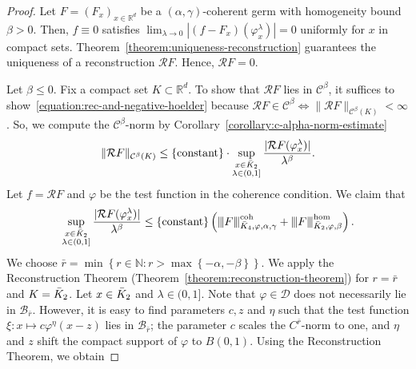 \begin{proof}
  Let \( F = (F_x)_{x \in \mathbb{R}^d} \) be a \( (\alpha, \gamma) \)-coherent germ with homogeneity bound \( \beta > 0 \). Then, \( f \equiv 0 \) satisfies \( \lim_{\lambda \to 0} |(f-F_x)(\varphi^\lambda_x)| = 0 \) uniformly for \( x \) in compact sets. Theorem~\ref{theorem:uniqueness-reconstruction} guarantees the uniqueness of a reconstruction \( \mathcal{R}F \). Hence, \( \mathcal{R}F = 0 \).

  Let \( \beta \leq 0 \). Fix a compact set \( K \subset \mathbb{R}^d \). To show that \( \mathcal{R}F \) lies in \( \mathcal{C}^\beta \), it suffices to show~\eqref{equation:rec-and-negative-hoelder} because \( \mathcal{R}F \in \mathcal{C}^\beta \iff \lVert \mathcal{R}F \rVert_{\mathcal{C}^\beta(K)} < \infty \). So, we compute the \( \mathcal{C}^\beta \)-norm by Corollary~\ref{corollary:c-alpha-norm-estimate}
  \begin{align*}
    \lVert \mathcal{R}F \rVert_{\mathcal{C}^\beta(K)}  
    \leq  
    \{ \mathrm{constant} \} \cdot \sup_{\substack{x \in \bar{K}_{2} \\ \lambda \in (0,1]}} 
    \frac{|\mathcal{R}F(\varphi^{\lambda}_x)|}{\lambda^\beta}.
  \end{align*}
  Let \( f = \mathcal{R}F \) and \( \varphi \) be the test function in the coherence condition. We claim that 
  \begin{align*}
    \sup_{\substack{x \in \bar{K}_{2} \\ \lambda \in (0,1]}} 
    \frac{|\mathcal{R}F(\varphi^{\lambda}_x)|}{\lambda^\beta} \leq \left\{  \mathrm{constant} \right\} \left( {\left\vert\kern-0.25ex\left\vert\kern-0.25ex\left\vert F \right\vert\kern-0.25ex\right\vert\kern-0.25ex\right\vert}^{\mathrm{coh}}_{\bar{K}_{4}, \varphi, \alpha, \gamma} + {\left\vert\kern-0.25ex\left\vert\kern-0.25ex\left\vert F \right\vert\kern-0.25ex\right\vert\kern-0.25ex\right\vert}^{\mathrm{\hom}}_{\bar{K}_{2}, \varphi, \beta} \right).
  \end{align*}
  We choose \( \bar r = \min\left\{ r \in \mathbb{N} : r > \max\left\{ -\alpha, -\beta \right\}\right\} \). We apply the Reconstruction Theorem (Theorem~\ref{theorem:reconstruction-theorem}) for \( r = \bar r \) and \( K = \bar{K}_{2} \). Let \( x \in \bar{K}_{2} \) and \( \lambda \in (0,1] \). Note that \( \varphi \in \mathcal{D} \) does not necessarily lie in \( \mathcal{B}_{\bar r} \). However, it is easy to find parameters \( c, z \) and \( \eta \) such that the test function \( \xi: x \mapsto c \varphi^{\eta}(x - z) \) lies in \( \mathcal{B}_{\bar r} \); the parameter \( c \) scales the \( C^{\bar r} \)-norm to one, and \( \eta \) and \( z \) shift the compact support of \( \varphi \) to \( B(0,1) \). Using the Reconstruction Theorem, we obtain

\end{proof}
